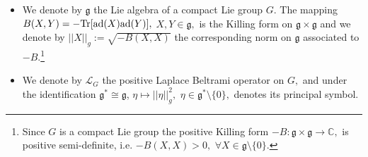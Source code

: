 \documentclass[12pt, reqno]{amsart}
\theoremstyle{definition}
\theoremstyle{remark}
\numberwithin{equation}{section}
\begin{document}
\begin{itemize}
\item We denote by $ \mathfrak{g}$   the Lie algebra  of a compact Lie group $G.$ The mapping  $B(X,Y)=-\textnormal{Tr}[\textnormal{ad}(X)\textnormal{ad}(Y)],$  $X,Y\in\mathfrak{g}, $ is the  Killing form on $\mathfrak{g}\times \mathfrak{g}$  and we denote by  $|| X ||_{g}:=\sqrt{-B(X,X)}$ the corresponding norm on $\mathfrak{g}$ associated to $-B.$\footnote{Since $G$ is a compact Lie group the positive Killing form  $-B:\mathfrak{g}\times \mathfrak{g}\rightarrow \mathbb{C},$ is positive semi-definite, i.e. $-B(X,X)>0,$ $\forall X\in \mathfrak{g}\setminus \{0\}.$}
    \item We denote by $\mathcal{L}_G$  the positive Laplace Beltrami operator on $G,$ and  under the identification $\mathfrak{g}^*\cong \mathfrak{g}$, $\eta\mapsto ||\eta ||^2_g,$ $\eta\in \mathfrak{g}^*\setminus \{0\},  $ denotes its principal symbol.
    

\end{itemize}
\end{document}
